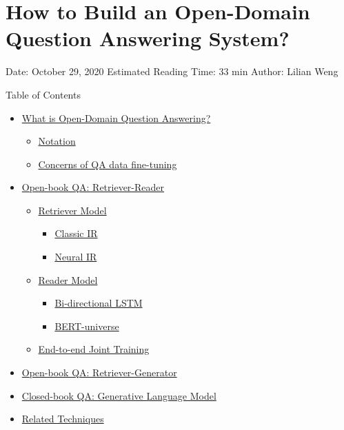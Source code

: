 \section{How to Build an Open-Domain Question Answering System?}\label{how-to-build-an-open-domain-question-answering-system}

Date: October 29, 2020 \textbar{} Estimated Reading Time: 33 min \textbar{} Author: Lilian Weng

{Table of Contents}

\begin{itemize}
\tightlist
\item
  \hyperref[what-is-open-domain-question-answering]{What is Open-Domain Question Answering?}

  \begin{itemize}
  \tightlist
  \item
    \hyperref[notation]{Notation}
  \item
    \hyperref[concerns-of-qa-data-fine-tuning]{Concerns of QA data fine-tuning}
  \end{itemize}
\item
  \hyperref[open-book-qa-retriever-reader]{Open-book QA: Retriever-Reader}

  \begin{itemize}
  \tightlist
  \item
    \hyperref[retriever-model]{Retriever Model}

    \begin{itemize}
    \tightlist
    \item
      \hyperref[classic-ir]{Classic IR}
    \item
      \hyperref[neural-ir]{Neural IR}
    \end{itemize}
  \item
    \hyperref[reader-model]{Reader Model}

    \begin{itemize}
    \tightlist
    \item
      \hyperref[bi-directional-lstm]{Bi-directional LSTM}
    \item
      \hyperref[bert-universe]{BERT-universe}
    \end{itemize}
  \item
    \hyperref[end-to-end-joint-training]{End-to-end Joint Training}
  \end{itemize}
\item
  \hyperref[open-book-qa-retriever-generator]{Open-book QA: Retriever-Generator}
\item
  \hyperref[closed-book-qa-generative-language-model]{Closed-book QA: Generative Language Model}
\item
  \hyperref[related-techniques]{Related Techniques}


\end{itemize}
